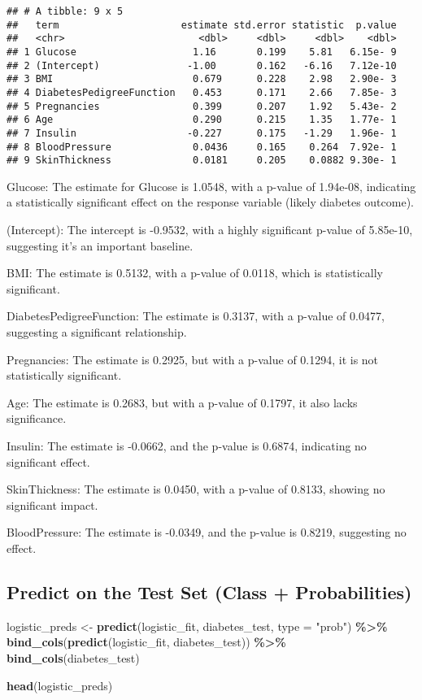 \documentclass[
]{article}
\newenvironment{Shaded}{\begin{snugshade}}{\end{snugshade}}
\newcommand{\AttributeTok}[1]{\textcolor[rgb]{0.13,0.29,0.53}{#1}}
\newcommand{\FunctionTok}[1]{\textcolor[rgb]{0.13,0.29,0.53}{\textbf{#1}}}
\newcommand{\NormalTok}[1]{#1}
\newcommand{\OtherTok}[1]{\textcolor[rgb]{0.56,0.35,0.01}{#1}}
\newcommand{\SpecialCharTok}[1]{\textcolor[rgb]{0.81,0.36,0.00}{\textbf{#1}}}
\newcommand{\StringTok}[1]{\textcolor[rgb]{0.31,0.60,0.02}{#1}}
\begin{document}
\begin{verbatim}
## # A tibble: 9 x 5
##   term                     estimate std.error statistic  p.value
##   <chr>                       <dbl>     <dbl>     <dbl>    <dbl>
## 1 Glucose                    1.16       0.199    5.81   6.15e- 9
## 2 (Intercept)               -1.00       0.162   -6.16   7.12e-10
## 3 BMI                        0.679      0.228    2.98   2.90e- 3
## 4 DiabetesPedigreeFunction   0.453      0.171    2.66   7.85e- 3
## 5 Pregnancies                0.399      0.207    1.92   5.43e- 2
## 6 Age                        0.290      0.215    1.35   1.77e- 1
## 7 Insulin                   -0.227      0.175   -1.29   1.96e- 1
## 8 BloodPressure              0.0436     0.165    0.264  7.92e- 1
## 9 SkinThickness              0.0181     0.205    0.0882 9.30e- 1
\end{verbatim}

Glucose: The estimate for Glucose is 1.0548, with a p-value of 1.94e-08,
indicating a statistically significant effect on the response variable
(likely diabetes outcome).

(Intercept): The intercept is -0.9532, with a highly significant p-value
of 5.85e-10, suggesting it's an important baseline.

BMI: The estimate is 0.5132, with a p-value of 0.0118, which is
statistically significant.

DiabetesPedigreeFunction: The estimate is 0.3137, with a p-value of
0.0477, suggesting a significant relationship.

Pregnancies: The estimate is 0.2925, but with a p-value of 0.1294, it is
not statistically significant.

Age: The estimate is 0.2683, but with a p-value of 0.1797, it also lacks
significance.

Insulin: The estimate is -0.0662, and the p-value is 0.6874, indicating
no significant effect.

SkinThickness: The estimate is 0.0450, with a p-value of 0.8133, showing
no significant impact.

BloodPressure: The estimate is -0.0349, and the p-value is 0.8219,
suggesting no effect.

\subsection{Predict on the Test Set (Class +
Probabilities)}\label{predict-on-the-test-set-class-probabilities}

\begin{Shaded}
\begin{Highlighting}[]
\NormalTok{logistic\_preds }\OtherTok{\textless{}{-}} 
  \FunctionTok{predict}\NormalTok{(logistic\_fit, diabetes\_test, }\AttributeTok{type =} \StringTok{"prob"}\NormalTok{) }\SpecialCharTok{\%\textgreater{}\%}
  \FunctionTok{bind\_cols}\NormalTok{(}\FunctionTok{predict}\NormalTok{(logistic\_fit, diabetes\_test)) }\SpecialCharTok{\%\textgreater{}\%}
  \FunctionTok{bind\_cols}\NormalTok{(diabetes\_test)}

\FunctionTok{head}\NormalTok{(logistic\_preds)}
\end{Highlighting}
\end{Shaded}
\end{document}
